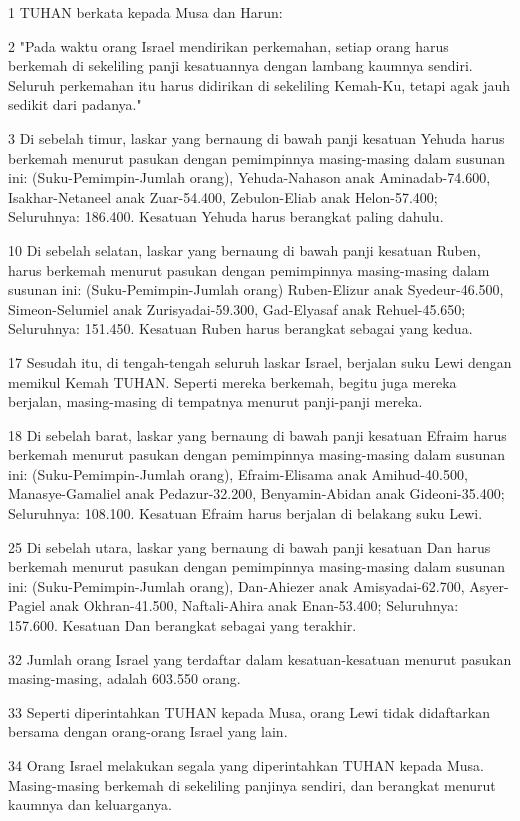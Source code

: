 \par 1 TUHAN berkata kepada Musa dan Harun:
\par 2 "Pada waktu orang Israel mendirikan perkemahan, setiap orang harus berkemah di sekeliling panji kesatuannya dengan lambang kaumnya sendiri. Seluruh perkemahan itu harus didirikan di sekeliling Kemah-Ku, tetapi agak jauh sedikit dari padanya."
\par 3 Di sebelah timur, laskar yang bernaung di bawah panji kesatuan Yehuda harus berkemah menurut pasukan dengan pemimpinnya masing-masing dalam susunan ini: (Suku-Pemimpin-Jumlah orang), Yehuda-Nahason anak Aminadab-74.600, Isakhar-Netaneel anak Zuar-54.400, Zebulon-Eliab anak Helon-57.400; Seluruhnya: 186.400. Kesatuan Yehuda harus berangkat paling dahulu.
\par 10 Di sebelah selatan, laskar yang bernaung di bawah panji kesatuan Ruben, harus berkemah menurut pasukan dengan pemimpinnya masing-masing dalam susunan ini: (Suku-Pemimpin-Jumlah orang) Ruben-Elizur anak Syedeur-46.500, Simeon-Selumiel anak Zurisyadai-59.300, Gad-Elyasaf anak Rehuel-45.650; Seluruhnya: 151.450. Kesatuan Ruben harus berangkat sebagai yang kedua.
\par 17 Sesudah itu, di tengah-tengah seluruh laskar Israel, berjalan suku Lewi dengan memikul Kemah TUHAN. Seperti mereka berkemah, begitu juga mereka berjalan, masing-masing di tempatnya menurut panji-panji mereka.
\par 18 Di sebelah barat, laskar yang bernaung di bawah panji kesatuan Efraim harus berkemah menurut pasukan dengan pemimpinnya masing-masing dalam susunan ini: (Suku-Pemimpin-Jumlah orang), Efraim-Elisama anak Amihud-40.500, Manasye-Gamaliel anak Pedazur-32.200, Benyamin-Abidan anak Gideoni-35.400; Seluruhnya: 108.100. Kesatuan Efraim harus berjalan di belakang suku Lewi.
\par 25 Di sebelah utara, laskar yang bernaung di bawah panji kesatuan Dan harus berkemah menurut pasukan dengan pemimpinnya masing-masing dalam susunan ini: (Suku-Pemimpin-Jumlah orang), Dan-Ahiezer anak Amisyadai-62.700, Asyer-Pagiel anak Okhran-41.500, Naftali-Ahira anak Enan-53.400; Seluruhnya: 157.600. Kesatuan Dan berangkat sebagai yang terakhir.
\par 32 Jumlah orang Israel yang terdaftar dalam kesatuan-kesatuan menurut pasukan masing-masing, adalah 603.550 orang.
\par 33 Seperti diperintahkan TUHAN kepada Musa, orang Lewi tidak didaftarkan bersama dengan orang-orang Israel yang lain.
\par 34 Orang Israel melakukan segala yang diperintahkan TUHAN kepada Musa. Masing-masing berkemah di sekeliling panjinya sendiri, dan berangkat menurut kaumnya dan keluarganya.

